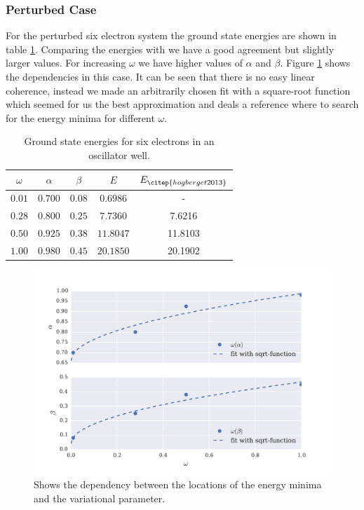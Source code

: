 \subsubsection{Perturbed Case}\label{sec:perturbed_six}
For the perturbed six electron system the ground state energies are shown in table \ref{tab:groundstate_sixelectron}. Comparing the energies with \citet[TABLE III]{lohne2011} we have a good agreement but slightly larger values. For increasing $\omega$ we have higher values of $\alpha$ and $\beta$. Figure \ref{fig:alpha_beta_omega} shows the dependencies in this case. It can be seen that there is no easy linear coherence, instead we made an arbitrarily chosen fit with a square-root function which seemed for us the best approximation and deals a reference where to search for the energy minima for different $\omega$. 
\begin{table}
    \centering
    \caption{Ground state energies for six electrons in an oscillator well.}
    \begin{tabular}{c|cc|c|c}
    \toprule
    $\omega$   & $\alpha$    & $\beta$ &    $E$  & $E_{\citep{hogberget2013}}$  \\ 
    \midrule
    $0.01$     & $0.700$       & $0.08$  & $0.6986$ & - \\
    $0.28$     & $0.800$       & $0.25$  & $7.7360$  & 7.6216 \\
    $0.50$      & $0.925$	    & $0.38$  & $11.8047$ & 11.8103 \\
    $1.00$     & $0.980$      & $0.45$  & $20.1850$ & 20.1902 \\
    \bottomrule
    \end{tabular}
    \label{tab:groundstate_sixelectron}
\end{table}
\begin{figure}[htbp]
    \centering
    \includegraphics[scale=0.7]{alpha_beta_omega.pdf}
    \caption{Shows the dependency between the locations of the energy minima and the variational parameter.}
    \label{fig:alpha_beta_omega}
\end{figure}


